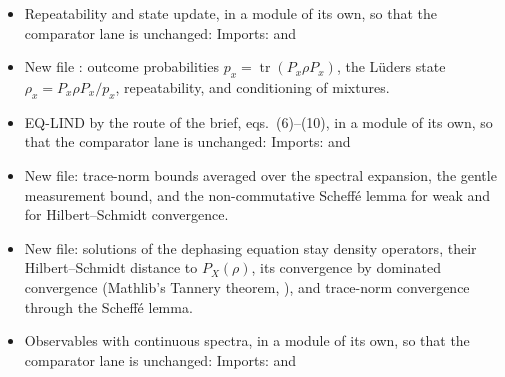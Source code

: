 \documentclass[11pt]{article}
\begin{document}
\begin{itemize}
\item Repeatability and state update, in a module of its own, so that the comparator lane is
  unchanged:\newline
  \newline
  Imports:  and\newline
\item New file : outcome probabilities
  $p_x = \operatorname{tr}(P_x\rho P_x)$, the L\"uders state $\rho_x = P_x\rho P_x/p_x$,
  repeatability, and conditioning of mixtures.
\item EQ-LIND by the route of the brief, eqs.~(6)--(10), in a module of its own, so that the
  comparator lane is unchanged:\newline
  \newline
  Imports:  and\newline
\item New file:\newline {}\newline
  trace-norm bounds
  averaged over the spectral expansion, the gentle measurement bound, and the non-commutative
  Scheff\'e lemma for weak and for Hilbert--Schmidt convergence.
\item New file:\newline {}\newline
  solutions of the dephasing equation stay density operators, their Hilbert--Schmidt distance to
  $P_X(\rho)$, its convergence by dominated convergence (Mathlib's Tannery theorem,
  ), and trace-norm convergence through the
  Scheff\'e lemma.
\item Observables with continuous spectra, in a module of its own, so that the comparator lane is
  unchanged:\newline
  \newline
  Imports:  and\newline

\end{itemize}
\end{document}

